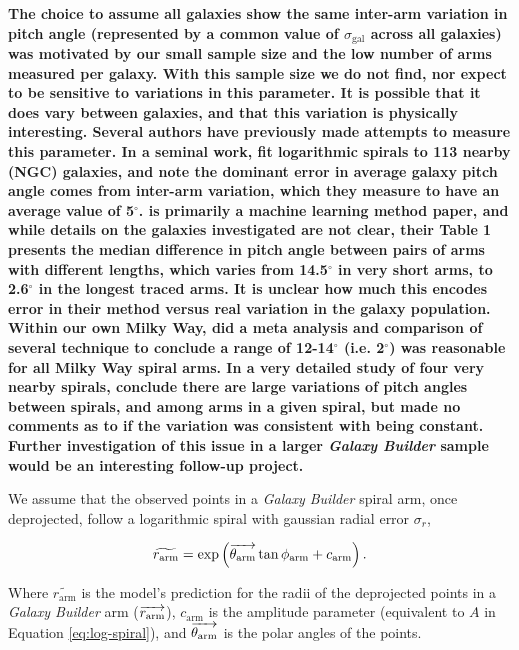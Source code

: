 \textbf{The choice to assume all galaxies show the same inter-arm variation in pitch angle (represented by a common value of $\sigma_\mathrm{gal}$ across all galaxies) was motivated by our small sample size and the low number of arms measured per galaxy. With this sample size we do not find, nor expect to be sensitive to variations in this parameter. It is possible that it does vary between galaxies, and that this variation is physically interesting. Several authors have previously made attempts to measure this parameter.  In a seminal work, \citet{1981AJ.....86.1847K} fit logarithmic spirals to 113 nearby (NGC) galaxies, and note the dominant error in average galaxy pitch angle comes from inter-arm variation, which they measure to have an average value of 5$^\circ$. \citet{2014ApJ...790...87D} is primarily a machine learning method paper, and while details on the galaxies investigated are not clear, their Table 1 presents the median difference in pitch angle between pairs of arms with different lengths, which varies from 14.5$^\circ$ in very short arms, to 2.6$^\circ$ in the longest traced arms. It is unclear how much this encodes error in their method versus real variation in the galaxy population. Within our own Milky Way, \citet{Vallee2015} did a meta analysis and comparison of several technique to conclude a range of 12-14$^\circ$ (i.e. 2$^\circ$) was reasonable for all Milky Way spiral arms. In a very detailed study of four very nearby spirals, \citet{HonigRead2015} conclude there are large variations of pitch angles  between spirals, and among arms in a given spiral, but made no comments as to if the variation was consistent with being constant. Further investigation of this issue in a larger \textit{Galaxy Builder} sample would be an interesting follow-up project.}

We assume that the observed points in a \textit{Galaxy Builder} spiral arm, once deprojected, follow a logarithmic spiral with gaussian radial error $\sigma_r$,

\begin{equation}
\widetilde{r_\mathrm{arm}} = \exp\left(\overrightarrow{\theta_\mathrm{arm}}\tan\phi_\mathrm{arm} + c_\mathrm{arm}\right).
\end{equation}

Where $\widetilde{r_\mathrm{arm}}$ is the model's prediction for the radii of the deprojected points in a \textit{Galaxy Builder} arm ($\overrightarrow{r_\mathrm{arm}}$), $c_\mathrm{arm}$ is the amplitude parameter (equivalent to $A$ in Equation \ref{eq:log-spiral}), and $\overrightarrow{\theta_\mathrm{arm}}$ is the polar angles of the points.

